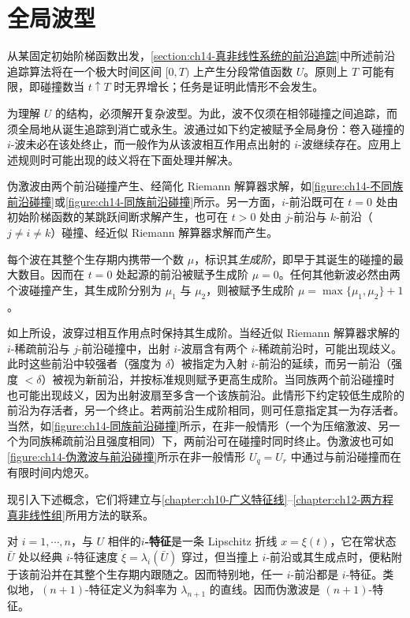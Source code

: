 \documentclass[../../main.tex]{subfiles}
\begin{document}
\section{全局波型}\label{section:ch14-全局波型}

从某固定初始阶梯函数出发，\cref{section:ch14-真非线性系统的前沿追踪}中所述前沿追踪算法将在一个极大时间区间 $[0,T)$ 上产生分段常值函数 $U$。原则上 $T$ 可能有限，即碰撞数当 $t\uparrow T$ 时无界增长；任务是证明此情形不会发生。

为理解 $U$ 的结构，必须解开复杂波型。为此，波不仅须在相邻碰撞之间追踪，而须全局地从诞生追踪到消亡或永生。波通过如下约定被赋予全局身份：卷入碰撞的 $i$-波未必在该处终止，而一般作为从该波相互作用点出射的 $i$-波继续存在。应用上述规则时可能出现的歧义将在下面处理并解决。

伪激波由两个前沿碰撞产生、经简化 Riemann 解算器求解，如\cref{figure:ch14-不同族前沿碰撞}或\cref{figure:ch14-同族前沿碰撞}所示。另一方面，$i$-前沿既可在 $t=0$ 处由初始阶梯函数的某跳跃间断求解产生，也可在 $t>0$ 处由 $j$-前沿与 $k$-前沿（$j\neq i\neq k$）碰撞、经近似 Riemann 解算器求解而产生。

每个波在其整个生存期内携带一个数 $\mu$，标识其\emph{生成阶}，即早于其诞生的碰撞的最大数目。因而在 $t=0$ 处起源的前沿被赋予生成阶 $\mu=0$。任何其他新波必然由两个波碰撞产生，其生成阶分别为 $\mu_1$ 与 $\mu_2$，则被赋予生成阶 $\mu=\max\{\mu_1,\mu_2\}+1$。

如上所设，波穿过相互作用点时保持其生成阶。当经近似 Riemann 解算器求解的 $i$-稀疏前沿与 $j$-前沿碰撞中，出射 $i$-波扇含有两个 $i$-稀疏前沿时，可能出现歧义。此时这些前沿中较强者（强度为 $\delta$）被指定为入射 $i$-前沿的延续，而另一前沿（强度 $<\delta$）被视为新前沿，并按标准规则赋予更高生成阶。当同族两个前沿碰撞时也可能出现歧义，因为出射波扇至多含一个该族前沿。此情形下约定较低生成阶的前沿为存活者，另一个终止。若两前沿生成阶相同，则可任意指定其一为存活者。当然，如\cref{figure:ch14-同族前沿碰撞}所示，在非一般情形（一个为压缩激波、另一个为同族稀疏前沿且强度相同）下，两前沿可在碰撞时同时终止。伪激波也可如\cref{figure:ch14-伪激波与前沿碰撞}所示在非一般情形 $U_q=U_r$ 中通过与前沿碰撞而在有限时间内熄灭。

现引入下述概念，它们将建立与\cref{chapter:ch10-广义特征线}--\cref{chapter:ch12-两方程真非线性组}所用方法的联系。



对 $i=1,\cdots,n$，与 $U$ 相伴的\textbf{$i$-特征}是一条 Lipschitz 折线 $x=\xi(t)$，它在常状态 $\bar U$ 处以经典 $i$-特征速度 $\dot\xi=\lambda_i(\bar U)$ 穿过，但当撞上 $i$-前沿或其生成点时，便粘附于该前沿并在其整个生存期内跟随之。因而特别地，任一 $i$-前沿都是 $i$-特征。类似地，$(n+1)$-特征定义为斜率为 $\lambda_{n+1}$ 的直线。因而伪激波是 $(n+1)$-特征。
\end{document}
